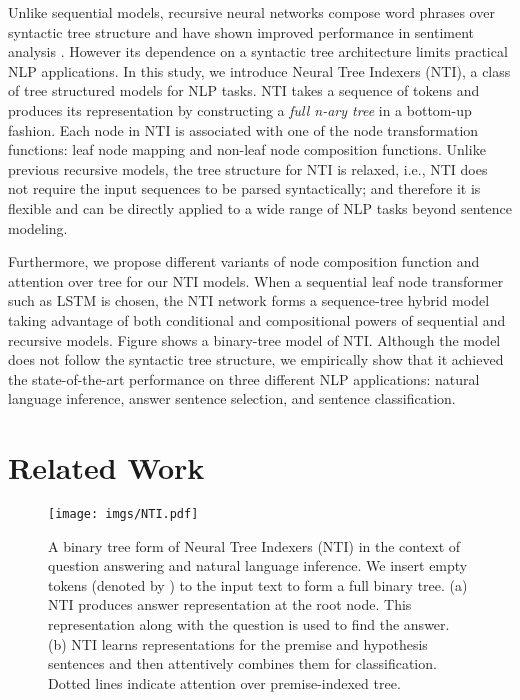 \documentclass[11pt]{article}
\begin{document}
Unlike sequential models, recursive neural networks compose word phrases over syntactic tree structure and have shown improved performance in sentiment analysis \cite{socher2013recursive}. However its dependence on a syntactic tree architecture limits practical NLP applications.  In this study, we introduce Neural Tree Indexers (NTI), a class of tree structured models for NLP tasks. NTI takes a sequence of tokens and produces its representation by constructing a \textit{full n-ary tree} in a bottom-up fashion. Each node in NTI is associated with one of the node transformation functions: leaf node mapping and non-leaf node composition functions. Unlike previous recursive models, the tree structure for NTI is relaxed, i.e., NTI does not require the input sequences to be parsed syntactically; and therefore it is flexible and can be directly applied to a wide range of NLP tasks beyond sentence modeling. 

Furthermore, we propose different variants of node composition function and attention over tree for our NTI models. When a sequential leaf node transformer such as LSTM is chosen, the NTI network forms a sequence-tree hybrid model taking advantage of both conditional and compositional powers of sequential and recursive models. Figure  shows a binary-tree model of NTI. Although the model does not follow the syntactic tree structure, we empirically show that it achieved the state-of-the-art performance on three different NLP applications: natural language inference, answer sentence selection, and sentence classification. 

\section{Related Work}

\begin{figure*}[t]
\centering
        \texttt{[image: imgs/NTI.pdf]}
        \caption{\label{figure:nti} A binary tree form of Neural Tree Indexers (NTI) in the context of question answering and natural language inference. We insert empty tokens (denoted by ) to the input text to form a full binary tree. (a) NTI produces answer representation at the root node. This representation along with the question is used to find the answer. (b) NTI learns representations for the premise and hypothesis sentences and then attentively combines them for classification. Dotted lines indicate attention over premise-indexed tree.}
        \label{figure:nti}
\end{figure*}
\end{document}
